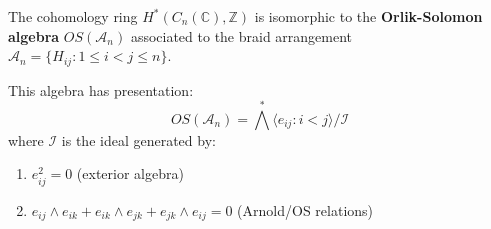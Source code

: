 \begin{theorem}
\label{thm:arnold-algebraic}
The cohomology ring $H^*(C_n(\mathbb{C}), \mathbb{Z})$ is isomorphic to the 
\textbf{Orlik-Solomon algebra} $OS(\mathcal{A}_n)$ associated to the braid arrangement 
$\mathcal{A}_n = \{H_{ij} : 1 \leq i < j \leq n\}$.

This algebra has presentation:
\begin{equation}
OS(\mathcal{A}_n) = \bigwedge^* \langle e_{ij} : i < j \rangle / \mathcal{I}
\end{equation}
where $\mathcal{I}$ is the ideal generated by:
\begin{enumerate}
\item $e_{ij}^2 = 0$ (exterior algebra)
\item $e_{ij} \wedge e_{ik} + e_{ik} \wedge e_{jk} + e_{jk} \wedge e_{ij} = 0$ 
(Arnold/OS relations)
\end{enumerate}
\end{theorem}

